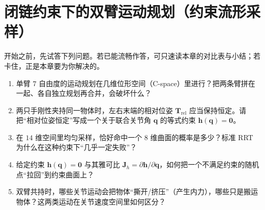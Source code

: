 \chapter{闭链约束下的双臂运动规划（约束流形采样）}\label{ch:arm-dualarm-planning}


\begin{practice}[前置自测]
开始之前，先试答下列问题。若已能流畅作答，可只速读本章的对比表与小结；若卡住，正是本章要为你解决的。
\begin{enumerate}
  \item 单臂 $7$ 自由度的运动规划在几维位形空间（C-space）里进行？把两条臂拼在一起、各自独立规划再合并，会破坏什么？
  \item 两只手刚性夹持同一物体时，左右末端的相对位姿 $\mathbf{T}_{\text{rel}}$ 应当保持恒定。请把“相对位姿恒定”写成一个关于联合关节角 $\mathbf{q}$ 的等式约束 $\mathbf{h}(\mathbf{q})=\mathbf{0}$。
  \item 在 $14$ 维空间里均匀采样，恰好命中一个 $8$ 维曲面的概率是多少？标准 RRT 为什么在这种约束下“几乎一定失败”？
  \item 给定约束 $\mathbf{h}(\mathbf{q})=\mathbf{0}$ 与其雅可比 $\mathbf{J}_h=\partial\mathbf{h}/\partial\mathbf{q}$，如何把一个不满足约束的随机点“拉回”到约束曲面上？
  \item 双臂共持时，哪些关节运动会把物体“撕开/挤压”（产生内力），哪些只是搬运物体？这两类运动在关节速度空间里如何区分？
\end{enumerate}
\end{practice}


